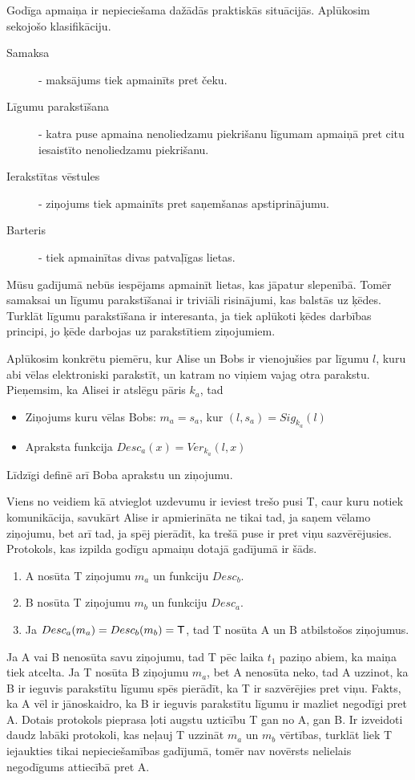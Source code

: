 Godīga apmaiņa ir nepieciešama dažādās praktiskās situācijās. Aplūkosim sekojošo klasifikāciju.\cite[p.~8]{asokan98}
\begin{description}
    \item[Samaksa] - maksājums tiek apmainīts pret čeku.
    \item[Līgumu parakstīšana] - katra puse apmaina nenoliedzamu piekrišanu līgumam apmaiņā pret citu iesaistīto nenoliedzamu piekrišanu.
    \item[Ierakstītas vēstules] - ziņojums tiek apmainīts pret saņemšanas apstiprinājumu.
    \item[Barteris] - tiek apmainītas divas patvaļīgas lietas.
\end{description}
Mūsu gadījumā nebūs iespējams apmainīt lietas, kas jāpatur slepenībā. Tomēr samaksai un līgumu parakstīšanai ir triviāli risinājumi, kas balstās uz ķēdes. Turklāt līgumu parakstīšana ir interesanta, ja tiek aplūkoti ķēdes darbības principi, jo ķēde darbojas uz parakstītiem ziņojumiem.

Aplūkosim konkrētu piemēru, kur Alise un Bobs ir vienojušies par līgumu $l$, kuru abi vēlas elektroniski parakstīt, un katram no viņiem vajag otra parakstu. Pieņemsim, ka Alisei ir atslēgu pāris $k_a$, tad
\begin{itemize}
    \item Ziņojums kuru vēlas Bobs: $m_a = s_a$, kur $(l, s_a) = Sig_{k_a}(l)$
    \item Apraksta funkcija $Desc_a(x) = Ver_{k_a}(l, x)$
\end{itemize}
Līdzīgi definē arī Boba aprakstu un ziņojumu.

Viens no veidiem kā atvieglot uzdevumu ir ieviest trešo pusi T, caur kuru notiek komunikācija, savukārt Alise ir apmierināta ne tikai tad, ja saņem vēlamo ziņojumu, bet arī tad, ja spēj pierādīt, ka trešā puse ir pret viņu sazvērējusies.
Protokols, kas izpilda godīgu apmaiņu dotajā gadījumā ir šāds.
\begin{enumerate}
    \item A nosūta T ziņojumu $m_a$ un funkciju $Desc_b$.
    \item B nosūta T ziņojumu $m_b$ un funkciju $Desc_a$.
    \item Ja $Desc_a(m_a) = Desc_b(m_b) = \textsf{T}$, tad T nosūta A un B atbilstošos ziņojumus.
\end{enumerate}
Ja A vai B nenosūta savu ziņojumu, tad T pēc laika $t_1$ paziņo abiem, ka maiņa tiek atcelta. Ja T nosūta B ziņojumu $m_a$, bet A nenosūta neko, tad A uzzinot, ka B ir ieguvis parakstītu līgumu spēs pierādīt, ka T ir sazvērējies pret viņu. Fakts, ka A vēl ir jānoskaidro, ka B ir ieguvis parakstītu līgumu ir mazliet negodīgi pret A. Dotais protokols pieprasa ļoti augstu uzticību T gan no A, gan B. Ir izveidoti daudz labāki protokoli, kas neļauj T uzzināt $m_a$ un $m_b$ vērtības, turklāt liek T iejaukties tikai nepieciešamības gadījumā, tomēr nav novērsts nelielais negodīgums attiecībā pret A.\cite{asokan98}

